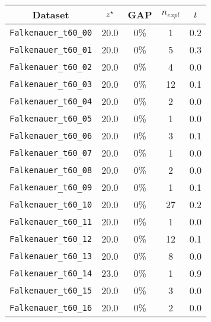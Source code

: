 \begin{figure}[!ht]
	\centering
	\scriptsize{
	\begin{minipage}{0.47\linewidth}
		\centering
		\begin{tabular}{|ccccc|}
			\hline
			\rowcolor{gray!50}
			Dataset                      & ${z}^{\star}$ & GAP & $n_{expl}$ & $t$ \\
			\hline
			\texttt{Falkenauer\_t60\_00} & 20.0           & 0\% & 1               & 0.2       \\
			\texttt{Falkenauer\_t60\_01} & 20.0           & 0\% & 5               & 0.3       \\
			\texttt{Falkenauer\_t60\_02} & 20.0           & 0\% & 4               & 0.0         \\
			\texttt{Falkenauer\_t60\_03} & 20.0           & 0\% & 12              & 0.1       \\
			\texttt{Falkenauer\_t60\_04} & 20.0           & 0\% & 2               & 0.0         \\
			\texttt{Falkenauer\_t60\_05} & 20.0           & 0\% & 1               & 0.0         \\
			\texttt{Falkenauer\_t60\_06} & 20.0           & 0\% & 3               & 0.1       \\
			\texttt{Falkenauer\_t60\_07} & 20.0           & 0\% & 1               & 0.0         \\
			\texttt{Falkenauer\_t60\_08} & 20.0           & 0\% & 2               & 0.0         \\
			\texttt{Falkenauer\_t60\_09} & 20.0           & 0\% & 1               & 0.1       \\
			\texttt{Falkenauer\_t60\_10} & 20.0           & 0\% & 27              & 0.2       \\
			\texttt{Falkenauer\_t60\_11} & 20.0           & 0\% & 1               & 0.0         \\
			\texttt{Falkenauer\_t60\_12}& 20.0           & 0\% & 12              & 0.1       \\
			\texttt{Falkenauer\_t60\_13} & 20.0           & 0\% & 8               & 0.0         \\
			\texttt{Falkenauer\_t60\_14} & 23.0           & 0\% & 1               & 0.9      \\
			\texttt{Falkenauer\_t60\_15} & 20.0           & 0\% & 3               & 0.0         \\
			\texttt{Falkenauer\_t60\_16} & 20.0           & 0\% & 2               & 0.0         \\

\end{tabular}
\end{minipage}}
\end{figure}
